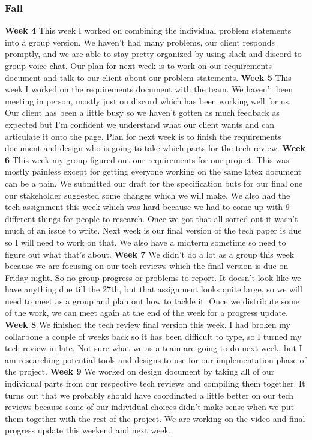 \documentclass[onecolumn, draftclsnofoot, 10pt, compsoc]{IEEEtran}
\begin{document}
\subsubsection{Fall}
\textbf{Week 4}
This week I worked on combining the individual problem statements into a group version. We haven't had many problems, our client responds promptly, and we are able to stay pretty organized by using slack and discord to group voice chat. Our plan for next week is to work on our requirements document and talk to our client about our problem statements. 
\newline
\textbf{Week 5}
This week I worked on the requirements document with the team. We haven't been meeting in person, mostly just on discord which has been working well for us. Our client has been a little busy so we haven't gotten as much feedback as expected but I'm confident we understand what our client wants and can articulate it onto the page. Plan for next week is to finish the requirements document and design who is going to take which parts for the tech review. 
\newline
\textbf{Week 6}
This week my group figured out our requirements for our project. This was mostly painless except for getting everyone working on the same latex document can be a pain. We submitted our draft for the specification buts for our final one our stakeholder suggested some changes which we will make. We also had the tech assignment this week which was hard because we had to come up with 9 different things for people to research. Once we got that all sorted out it wasn't much of an issue to write. Next week is our final version of the tech paper is due so I will need to work on that. We also have a midterm sometime so need to figure out what that's about.
\newline
\textbf{Week 7}
We didn't do a lot as a group this week because we are focusing on our tech reviews which the final version is due on Friday night. So no group progress or problems to report. It doesn't look like we have anything due till the 27th, but that assignment looks quite large, so we will need to meet as a group and plan out how to tackle it. Once we distribute some of the work, we can meet again at the end of the week for a progress update. 
\newline
\textbf{Week 8}
We finished the tech review final version this week. I had broken my collarbone a couple of weeks back so it has been difficult to type, so I turned my tech review in late. Not sure what we as a team are going to do next week, but I am researching potential tools and designs to use for our implementation phase of the project. 
\newline
\textbf{Week 9}
We worked on design document by taking all of our individual parts from our respective tech reviews and compiling them together. It turns out that we probably should have coordinated a little better on our tech reviews because some of our individual choices didn't make sense when we put them together with the rest of the project. We are working on the video and final progress update this weekend and next week.
\end{document}
